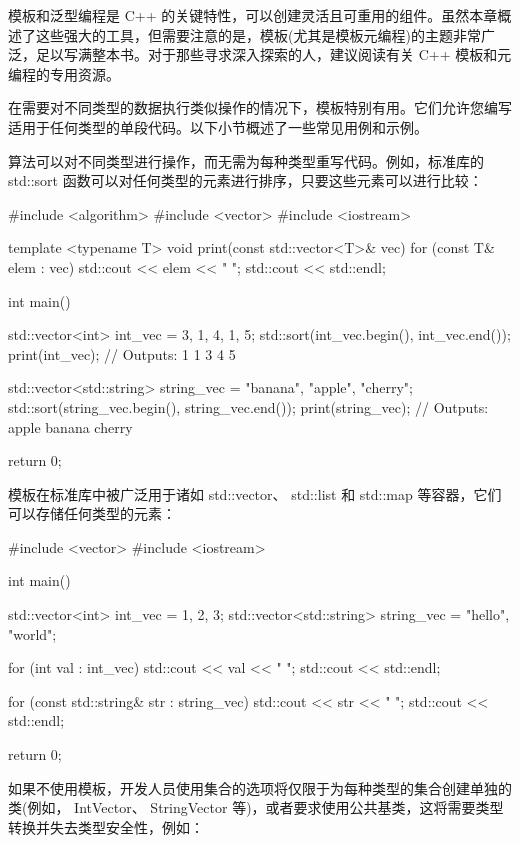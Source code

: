 模板和泛型编程是 C++ 的关键特性，可以创建灵活且可重用的组件。虽然本章概述了这些强大的工具，但需要注意的是，模板(尤其是模板元编程)的主题非常广泛，足以写满整本书。对于那些寻求深入探索的人，建议阅读有关 C++ 模板和元编程的专用资源。


在需要对不同类型的数据执行类似操作的情况下，模板特别有用。它们允许您编写适用于任何类型的单段代码。以下小节概述了一些常见用例和示例。


算法可以对不同类型进行操作，而无需为每种类型重写代码。例如，标准库的 std::sort 函数可以对任何类型的元素进行排序，只要这些元素可以进行比较：

\begin{cpp}
#include <algorithm>
#include <vector>
#include <iostream>

template <typename T>
void print(const std::vector<T>& vec) {
    for (const T& elem : vec) {
        std::cout << elem << " ";
    }
    std::cout << std::endl;
}

int main() {
    std::vector<int> int_vec = {3, 1, 4, 1, 5};
    std::sort(int_vec.begin(), int_vec.end());
    print(int_vec); // Outputs: 1 1 3 4 5

    std::vector<std::string> string_vec = {"banana", "apple", "cherry"};
    std::sort(string_vec.begin(), string_vec.end());
    print(string_vec); // Outputs: apple banana cherry

    return 0;
}
\end{cpp}


模板在标准库中被广泛用于诸如 std::vector、 std::list 和 std::map 等容器，它们可以存储任何类型的元素：

\begin{cpp}
#include <vector>
#include <iostream>

int main() {
    std::vector<int> int_vec = {1, 2, 3};
    std::vector<std::string> string_vec = {"hello", "world"};

    for (int val : int_vec) {
        std::cout << val << " ";
    }
    std::cout << std::endl;

    for (const std::string& str : string_vec) {
        std::cout << str << " ";
    }
    std::cout << std::endl;

    return 0;
}
\end{cpp}

如果不使用模板，开发人员使用集合的选项将仅限于为每种类型的集合创建单独的类(例如， IntVector、 StringVector 等)，或者要求使用公共基类，这将需要类型转换并失去类型安全性，例如：

